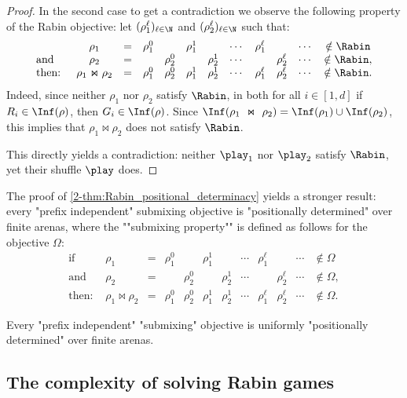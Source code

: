 \begin{proof}
In the second case to get a contradiction we observe the following property of the Rabin objective:
let $(\rho_1^\ell)_{\ell \in \N}$ and $(\rho_2^\ell)_{\ell \in \N}$ such that:
\[
\begin{array}{lccccccccccc}
& \rho_1 & = & \rho_1^0 & & \rho_1^1 & & \cdots & \rho_1^\ell & & \cdots & \notin \Rabin \\
\text{and} & \rho_2 & = & & \rho_2^0 & & \rho_2^1 & \cdots & & \rho_2^\ell & \cdots & \notin \Rabin, \\ 
\text{then: } & \rho_1 \Join \rho_2 & = & \rho_1^0 & \rho_2^0 & \rho_1^1 & \rho_2^1 & \cdots & \rho_1^\ell & \rho_2^\ell & \cdots & \notin \Rabin.
\end{array}
\]
Indeed, since neither $\rho_1$ nor $\rho_2$ satisfy $\Rabin$, in both for all $i \in [1,d]$ if $R_i \in \Inf(\rho)$, then $G_i \in \Inf(\rho)$.
Since $\Inf(\rho_1~\Join~\rho_2) = \Inf(\rho_1) \cup \Inf(\rho_2)$, this implies that $\rho_1 \Join \rho_2$ does not satisfy $\Rabin$.

This directly yields a contradiction: neither $\play_1$ nor $\play_2$ satisfy $\Rabin$, yet their shuffle $\play$ does.
\end{proof}

The proof of \cref{2-thm:Rabin_positional_determinacy} yields a stronger result: every "prefix independent" submixing objective is "positionally determined" over finite arenas, where the ""submixing property"" is defined as follows for the objective $\Omega$:
\[
\begin{array}{lccccccccccc}
\text{if} & \rho_1 & = & \rho_1^0 & & \rho_1^1 & & \cdots & \rho_1^\ell & & \cdots & \notin \Omega \\
\text{and} & \rho_2 & = & & \rho_2^0 & & \rho_2^1 & \cdots & & \rho_2^\ell & \cdots & \notin \Omega, \\ 
\text{then: } & \rho_1 \Join \rho_2 & = & \rho_1^0 & \rho_2^0 & \rho_1^1 & \rho_2^1 & \cdots & \rho_1^\ell & \rho_2^\ell & \cdots & \notin \Omega.
\end{array}
\]

\begin{theorem}
\label{2-thm:submixing_positional}
Every "prefix independent" "submixing" objective is uniformly "positionally determined" over finite arenas.
\end{theorem}

\subsection*{The complexity of solving Rabin games}

